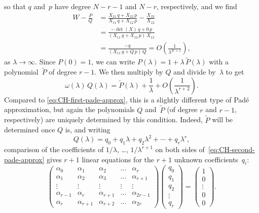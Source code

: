 \documentclass[10pt,a4paper]{article} \pdfoutput=1 
\begin{document}
so that $q$ and~$p$ have degree $N-r-1$ and $N-r$, respectively,
and we find
\begin{equation*}
  \begin{split}
    W - \frac{P}{Q}
    &
    = \frac{X_{21} \, q + X_{22} \, p}{X_{11} \, q + X_{12} \, p}
    - \frac{X_{22}}{X_{12}}
    \\ &
    = \frac{-\det(X) \, q + 0 \, p}{(X_{11} \, q + X_{12} \, p) \, X_{12}}
    \\ &
    = \frac{-q}{(X_{11} \, q + Q \, p) \, Q}
    = O \left( \frac{1}{\lambda^{2r+1}} \right)
    ,
  \end{split}
\end{equation*}
as $\lambda \to \infty$.
Since $P(0)=1$, we can write $P(\lambda) = 1 + \lambda \, \widetilde P(\lambda)$ with a
polynomial~$\widetilde P$ of degree $r-1$.
We then multiply by $Q$ and divide by~$\lambda$ to get
\begin{equation}
  \label{eq:CH-second-pade-approx}
  \omega(\lambda) \, Q(\lambda)
  = \widetilde P(\lambda)
  + \frac{1}{\lambda}
  + O \left( \frac{1}{\lambda^{r+2}} \right)
  .
\end{equation}
Compared to \eqref{eq:CH-first-pade-approx},
this is a slightly different type of Padé approximation,
but again the polynomials $Q$ and~$\widetilde P$ (of degree $r$ and $r-1$,
respectively) are uniquely determined by this condition.
Indeed, $\widetilde P$ will be determined once $Q$ is, and writing
\begin{equation*}
  Q(\lambda) = q_0 + q_1 \lambda + q_2 \lambda^2 + \dotsb + q_r \lambda^r
  ,
\end{equation*}
comparison of the coefficients of $1/\lambda$, \ldots, $1/\lambda^{r+1}$ on both sides
of~\eqref{eq:CH-second-pade-approx} gives $r+1$ linear equations
for the $r+1$ unknown coefficients~$q_i$:
\begin{equation}
  \begin{pmatrix}
    \alpha_0 & \alpha_1 & \alpha_2 & \dots & \alpha_r \\
    \alpha_1 & \alpha_2 & \alpha_3 & \dots & \alpha_{r+1} \\
    \vdots & \vdots & \vdots & \vdots & \vdots \\
    \alpha_{r-1} & \alpha_r & \alpha_{r+1} & \dots & \alpha_{2r-1} \\
    \alpha_{r} & \alpha_{r+1} & \alpha_{r+2} & \dots & \alpha_{2r}
  \end{pmatrix}
  \begin{pmatrix}
    q_0 \\ q_1 \\ q_2 \\ \vdots \\ q_r
  \end{pmatrix}
  =
  \begin{pmatrix}
    1 \\ 0 \\ \vdots \\ 0 \\ 0
  \end{pmatrix}
  .
\end{equation}
\end{document}
